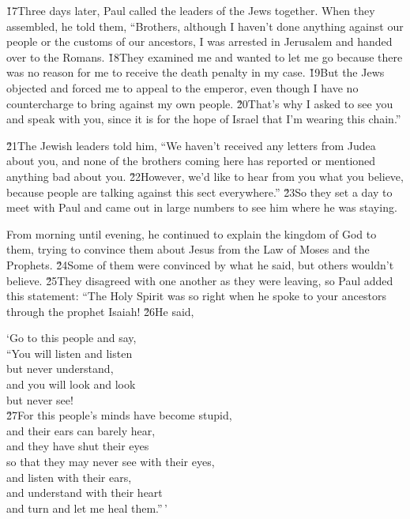 \v{17}Three days later, Paul called the leaders of the Jews together. When they assembled, he told them, ``Brothers, although I haven't done anything against our people or the customs of our ancestors, I was arrested in Jerusalem and handed over to the Romans. \v{18}They examined me and wanted to let me go because there was no reason for me to receive the death penalty in my case. \v{19}But the Jews objected and forced me to appeal to the emperor, even though I have no countercharge to bring against my own people. \v{20}That's why I asked to see you and speak with you, since it is for the hope of Israel that I'm wearing this chain.''

\v{21}The Jewish leaders told him, ``We haven't received any letters from Judea about you, and none of the brothers coming here has reported or mentioned anything bad about you. \v{22}However, we'd like to hear from you what you believe, because people are talking against this sect everywhere.'' \v{23}So they set a day to meet with Paul and came out in large numbers to see him where he was staying.

From morning until evening, he continued to explain the kingdom of God to them, trying to convince them about Jesus from the Law of Moses and the Prophets. \v{24}Some of them were convinced by what he said, but others wouldn't believe. \v{25}They disagreed with one another as they were leaving, so Paul added this statement: ``The Holy Spirit was so right when he spoke to your ancestors through the prophet Isaiah! \v{26}He said,

\begin{poetry}
\poeml `Go to this people and say, \\
\poemll    ``You will listen and listen \\
\poemlll       but never understand, \\
\poemll    and you will look and look \\
\poemlll       but never see! \\
\poeml \v{27}For this people's minds have become stupid, \\
\poemll    and their ears can barely hear, \\
\poeml and they have shut their eyes \\
\poemll    so that they may never see with their eyes, \\
\poeml and listen with their ears, \\
\poemll    and understand with their heart \\
\poeml and turn and let me heal them.''\,'
\end{poetry}

